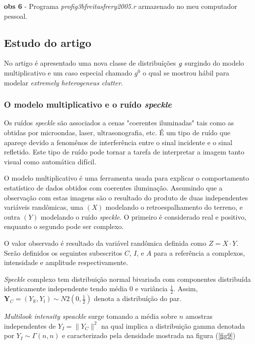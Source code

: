 {\bf obs 6} - Programa {\it profig3bfreitasfrery2005.r} armazenado no meu computador pessoal.

\subsection{Estudo do artigo  \cite{fmcs}}

No artigo é apresentado uma nova classe de distribuíções ${\it g}$ surgindo do modelo multiplicativo e um caso especial chamado {\it $g^{0}$} o qual se mostrou hábil para modelar  {\it extremely heterogeneus clutter}.


\subsubsection{O modelo multiplicativo e o ruído {\it speckle}}

Os ruídos {\it speckle} são associados a cenas "coerentes iluminadas" tais como as obtidas por microondas, laser, ultrasonografia, etc. É um tipo de ruído que apareçe devido a fenomênos de interferência entre o sinal incidente e o sinal refletido. Este tipo de ruído pode tornar a tarefa de interpretar a imagem tanto visual como automática difícil. 

O modelo multiplicativo é uma ferramenta usada para explicar o comportamento estatístico de dados obtidos com coerentes iluminação. Assumindo que a observação com estas imagens são o resultado do produto de duas independentes variáveis randômicas, uma $(X)$ modelando o retroespalhamento do terreno, e outra $(Y)$ modelando o ruído {\it speckle}. O primeiro é considerado real e positivo, enquanto o segundo pode ser complexo.

O valor observado é resultado da variável randômica definida como $Z=X\cdot Y$. Serão definidos os seguintes subescritos $C$, $I$, e $A$ para a referência a complexos, intensidade e amplitude respectivamente.

{\it Speckle} complexo tem distribuição normal bivariada com componentes distribuída identicamente independente tendo média $0$ e variância $\frac{1}{2}$. Assim, $\mathbf{Y}_{C}=(Y_{\mathbb{R}}, Y_{\mathbb{I}})\sim N2(0,\frac{1}{2})$ denota a distribuíção do par.

{\it Multilook intensity speackle} surge tomando a média sobre $n$ amostras independentes de $Y_{I}=\|Y_{C}\|^2$ na qual implica a distribuição gamma denotada por $Y_{I}\sim \Gamma(n,n)$ e caracterizado pela densidade mostrada na figura (\ref{fig9})

